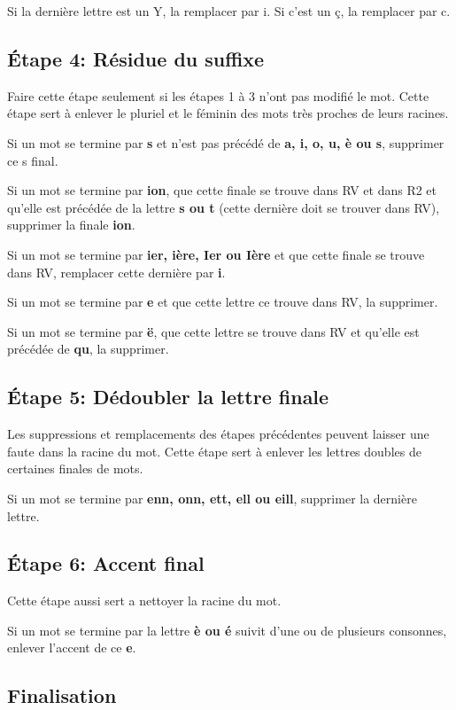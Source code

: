 Si la dernière lettre est un Y, la remplacer par i. Si c'est un ç, la remplacer par c.

\subsection*{Étape 4: Résidue du suffixe}

Faire cette étape seulement si les étapes 1 à 3 n'ont pas modifié le mot. Cette étape sert à enlever le pluriel et le féminin des mots très proches de leurs racines.

Si un mot se termine par \textbf{s} et n'est pas précédé de \textbf{a, i, o, u, è ou s}, supprimer ce s final.

Si un mot se termine par \textbf{ion}, que cette finale se trouve dans RV et dans R2 et qu'elle est précédée de la lettre \textbf{s ou t} (cette dernière doit se trouver dans RV), supprimer la finale \textbf{ion}.

Si un mot se termine par \textbf{ier, ière, Ier ou Ière} et que cette finale se trouve dans RV, remplacer cette dernière par \textbf{i}.

Si un mot se termine par \textbf{e} et que cette lettre ce trouve dans RV, la supprimer.

Si un mot se termine par \textbf{ë}, que cette lettre se trouve dans RV et qu'elle est précédée de \textbf{qu}, la supprimer.

\subsection*{Étape 5: Dédoubler la lettre finale}

Les suppressions et remplacements des étapes précédentes peuvent laisser une faute dans la racine du mot. Cette étape sert à enlever les lettres doubles de certaines finales de mots.

Si un mot se termine par \textbf{enn, onn, ett, ell ou eill}, supprimer la dernière lettre.

\subsection*{Étape 6: Accent final}

Cette étape aussi sert a nettoyer la racine du mot.

Si un mot se termine par la lettre \textbf{è ou é} suivit d'une ou de plusieurs consonnes, enlever l'accent de ce \textbf{e}.

\subsection*{Finalisation}

